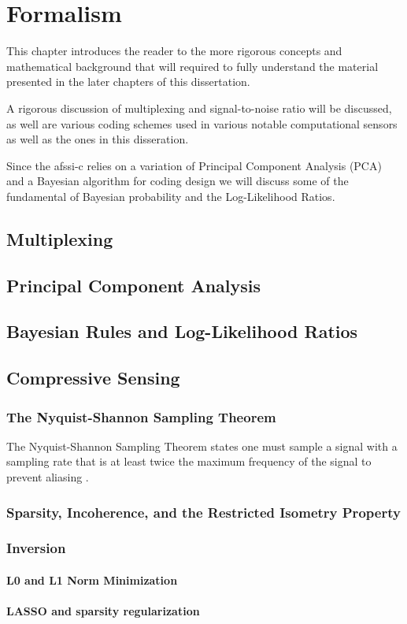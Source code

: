 \chapter{Formalism}\label{chap:Formalism}

This chapter introduces the reader to the more rigorous concepts and mathematical background that will required to fully understand the material presented in the later chapters of this dissertation. 

A rigorous discussion of multiplexing and signal-to-noise ratio will be discussed, as well are various coding schemes used in various notable computational sensors as well as the ones in this disseration. 

Since the \gls{afssi-c} relies on a variation of Principal Component Analysis (PCA) and a Bayesian algorithm for coding design we will discuss some of the fundamental of Bayesian probability and the Log-Likelihood Ratios. 



\section{Multiplexing}

\section{Principal Component Analysis}

\section{Bayesian Rules and Log-Likelihood Ratios}

\section{Compressive Sensing}

\subsection{The Nyquist-Shannon Sampling Theorem}

The Nyquist-Shannon Sampling Theorem states one must sample a signal with a sampling rate that is at least twice the maximum frequency of the signal to prevent aliasing \cite{shannon1949communication}.


\subsection{Sparsity, Incoherence, and the Restricted Isometry Property}

\subsection{Inversion}

\subsubsection{L0 and L1 Norm Minimization}

\subsubsection{LASSO and sparsity regularization}

%  
%



